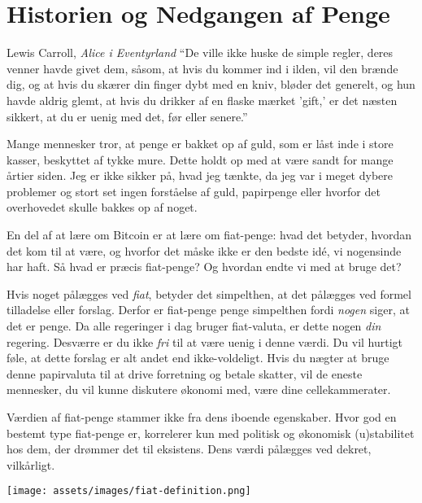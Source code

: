\chapter{Historien og Nedgangen af Penge}
\label{les:12}

\begin{chapquote}{Lewis Carroll, \textit{Alice i Eventyrland}}
\enquote{De ville ikke huske de simple regler, deres venner havde givet dem, 
såsom, at hvis du kommer ind i ilden, vil den brænde dig, og at hvis du skærer 
din finger dybt med en kniv, bløder det generelt, og hun havde aldrig glemt, 
at hvis du drikker af en flaske mærket 'gift,' er det næsten sikkert, at du 
er uenig med det, før eller senere.}
\end{chapquote}

Mange mennesker tror, at penge er bakket op af guld, som er låst inde i store 
kasser, beskyttet af tykke mure. Dette holdt op med at være sandt for mange 
årtier siden. Jeg er ikke sikker på, hvad jeg tænkte, da jeg var i meget 
dybere problemer og stort set ingen forståelse af guld, papirpenge eller 
hvorfor det overhovedet skulle bakkes op af noget.

En del af at lære om Bitcoin er at lære om fiat-penge: hvad det betyder, 
hvordan det kom til at være, og hvorfor det måske ikke er den bedste idé, 
vi nogensinde har haft. Så hvad er præcis fiat-penge? Og hvordan endte vi 
med at bruge det?

Hvis noget pålægges ved \textit{fiat}, betyder det simpelthen, at det pålægges 
ved formel tilladelse eller forslag. Derfor er fiat-penge penge simpelthen 
fordi \textit{nogen} siger, at det er penge. Da alle regeringer i dag bruger 
fiat-valuta, er dette nogen \textit{din} regering. Desværre er du ikke 
\textit{fri} til at være uenig i denne værdi. Du vil hurtigt føle, at dette 
forslag er alt andet end ikke-voldeligt. Hvis du nægter at bruge denne 
papirvaluta til at drive forretning og betale skatter, vil de eneste mennesker, 
du vil kunne diskutere økonomi med, være dine cellekammerater.

Værdien af fiat-penge stammer ikke fra dens iboende egenskaber. Hvor god en 
bestemt type fiat-penge er, korrelerer kun med politisk og økonomisk 
(u)stabilitet hos dem, der drømmer det til eksistens. Dens værdi pålægges ved 
dekret, vilkårligt.

\begin{center}
  \centering
  \texttt{[image: assets/images/fiat-definition.png]}
  \label{fig:fiat-definition}
  \end{center}
  

